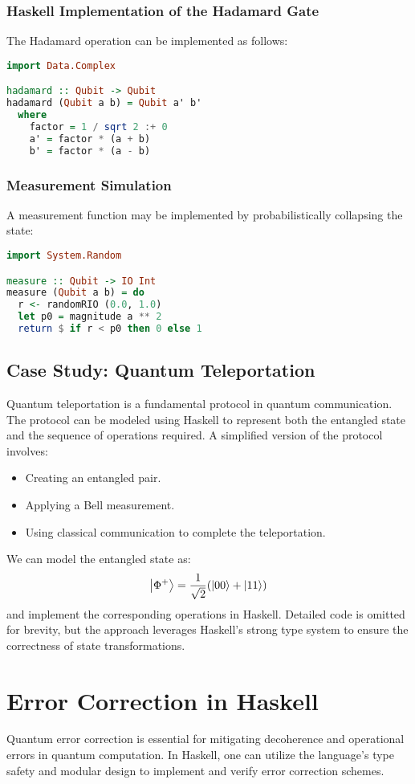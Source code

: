 \documentclass[12pt]{article}
\begin{document}
\subsubsection{Haskell Implementation of the Hadamard Gate}
The Hadamard operation can be implemented as follows:
\begin{lstlisting}[language=Haskell]
import Data.Complex

hadamard :: Qubit -> Qubit
hadamard (Qubit a b) = Qubit a' b'
  where
    factor = 1 / sqrt 2 :+ 0
    a' = factor * (a + b)
    b' = factor * (a - b)
\end{lstlisting}

\subsubsection{Measurement Simulation}
A measurement function may be implemented by probabilistically collapsing the state:
\begin{lstlisting}[language=Haskell]
import System.Random

measure :: Qubit -> IO Int
measure (Qubit a b) = do
  r <- randomRIO (0.0, 1.0)
  let p0 = magnitude a ** 2
  return $ if r < p0 then 0 else 1
\end{lstlisting}

\subsection{Case Study: Quantum Teleportation}
Quantum teleportation is a fundamental protocol in quantum communication. The protocol can be modeled using Haskell to represent both the entangled state and the sequence of operations required. A simplified version of the protocol involves:
\begin{itemize}
    \item Creating an entangled pair.
    \item Applying a Bell measurement.
    \item Using classical communication to complete the teleportation.
\end{itemize}
We can model the entangled state as:
\[
\ket{\Phi^+} = \frac{1}{\sqrt{2}} (\ket{00} + \ket{11})
\]
and implement the corresponding operations in Haskell. Detailed code is omitted for brevity, but the approach leverages Haskell’s strong type system to ensure the correctness of state transformations.

\section{Error Correction in Haskell}
\label{sec:errcorr}
Quantum error correction is essential for mitigating decoherence and operational errors in quantum computation. In Haskell, one can utilize the language’s type safety and modular design to implement and verify error correction schemes.
\end{document}
